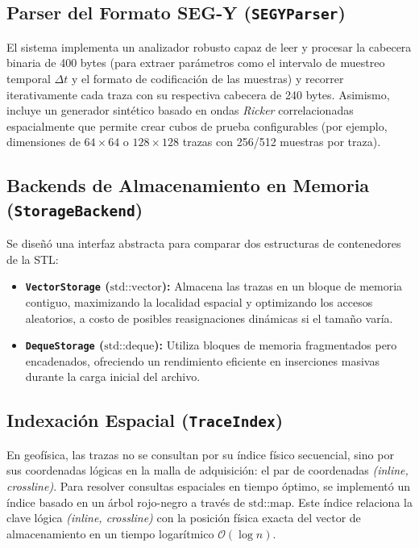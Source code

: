 \documentclass[11pt, a4paper]{article}
\begin{document}
\subsection{Parser del Formato SEG-Y (\texttt{SEGYParser})}
El sistema implementa un analizador robusto capaz de leer y procesar la cabecera binaria de 400 bytes (para extraer parámetros como el intervalo de muestreo temporal $\Delta t$ y el formato de codificación de las muestras) y recorrer iterativamente cada traza con su respectiva cabecera de 240 bytes. Asimismo, incluye un generador sintético basado en ondas \textit{Ricker} correlacionadas espacialmente que permite crear cubos de prueba configurables (por ejemplo, dimensiones de $64 \times 64$ o $128 \times 128$ trazas con 256/512 muestras por traza).

\subsection{Backends de Almacenamiento en Memoria (\texttt{StorageBackend})}
Se diseñó una interfaz abstracta para comparar dos estructuras de contenedores de la STL:
\begin{itemize}
    \item \textbf{\texttt{VectorStorage} ($\text{std::vector}$):} Almacena las trazas en un bloque de memoria contiguo, maximizando la localidad espacial y optimizando los accesos aleatorios, a costo de posibles reasignaciones dinámicas si el tamaño varía.
    \item \textbf{\texttt{DequeStorage} ($\text{std::deque}$):} Utiliza bloques de memoria fragmentados pero encadenados, ofreciendo un rendimiento eficiente en inserciones masivas durante la carga inicial del archivo.
\end{itemize}

\subsection{Indexación Espacial (\texttt{TraceIndex})}
En geofísica, las trazas no se consultan por su índice físico secuencial, sino por sus coordenadas lógicas en la malla de adquisición: el par de coordenadas \textit{(inline, crossline)}. Para resolver consultas espaciales en tiempo óptimo, se implementó un índice basado en un árbol rojo-negro a través de $\text{std::map}$. Este índice relaciona la clave lógica \textit{(inline, crossline)} con la posición física exacta del vector de almacenamiento en un tiempo logarítmico $\mathcal{O}(\log n)$.
\end{document}
